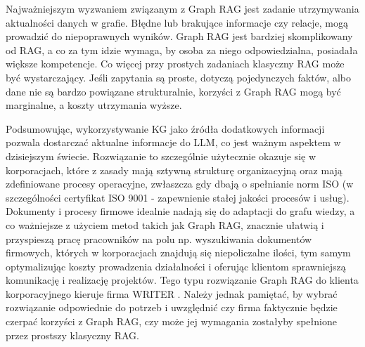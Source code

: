 \documentclass[
a4paper,
12pt,
]{article}
\begin{document}
Najważniejszym wyzwaniem związanym z Graph RAG jest zadanie utrzymywania aktualności danych w grafie. Błędne lub brakujące informacje czy relacje, mogą prowadzić do niepoprawnych wyników. 
Graph RAG jest bardziej skomplikowany od RAG, a co za tym idzie wymaga, by osoba za niego odpowiedzialna, posiadała większe kompetencje. Co więcej przy prostych zadaniach klasyczny RAG może być wystarczający. Jeśli zapytania są proste, dotyczą pojedynczych faktów, albo dane nie są bardzo powiązane strukturalnie, korzyści z Graph RAG mogą być marginalne, a koszty utrzymania wyższe.

Podsumowując, wykorzystywanie KG jako źródła dodatkowych informacji pozwala dostarczać aktualne informacje do LLM, co jest ważnym aspektem w dzisiejszym świecie. Rozwiązanie to szczególnie użytecznie okazuje się w korporacjach, które z zasady mają sztywną strukturę organizacyjną oraz mają zdefiniowane procesy operacyjne, zwłaszcza gdy dbają o spełnianie norm ISO (w szczególności certyfikat ISO 9001 - zapewnienie stałej jakości procesów i usług). Dokumenty i procesy firmowe idealnie nadają się do adaptacji do grafu wiedzy, a co ważniejsze z użyciem metod takich jak Graph RAG, znacznie ułatwią i przyspieszą pracę pracowników na polu np. wyszukiwania dokumentów firmowych, których w korporacjach znajdują się niepoliczalne ilości, tym samym optymalizując koszty prowadzenia działalności i oferując klientom sprawniejszą komunikację i realizację projektów. Tego typu rozwiązanie Graph RAG do klienta korporacyjnego kieruje firma WRITER \cite{writer}. Należy jednak pamiętać, by wybrać rozwiązanie odpowiednie do potrzeb i uwzględnić czy firma faktycznie będzie czerpać korzyści z Graph RAG, czy może jej wymagania zostałyby spełnione przez prostszy klasyczny RAG. 




\end{document}
